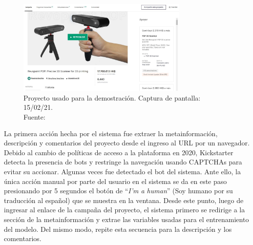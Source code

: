 \begin{figure}[!ht]
	\begin{center}
		\includegraphics[width=0.75\textwidth]{5/figures/example_project_150221.jpg}
		\caption[Proyecto usado para la demostración. Captura de pantalla: 15/02/21]{Proyecto usado para la demostración. Captura de pantalla: 15/02/21.\\
			Fuente: \cite{ot_kickstarter_revopointproject}}
		\label{4:fig30}
	\end{center}
\end{figure}

La primera acción hecha por el sistema fue extraer la metainformación, descripción y comentarios del proyecto desde el ingreso al URL por un navegador. Debido al cambio de políticas de acceso a la plataforma en 2020, Kickstarter detecta la presencia de bots y restringe la navegación usando CAPTCHAs para evitar su accionar. Algunas veces fue detectado el bot del sistema. Ante ello, la única acción manual por parte del usuario en el sistema se da en este paso presionando por 5 segundos el botón de “\textit{I'm a human}” (Soy humano por su traducción al español) que se muestra en la ventana. Desde este punto, luego de ingresar al enlace de la campaña del proyecto, el sistema primero se redirige a la sección de la metainformación y extrae las variables usadas para el entrenamiento del modelo. Del mismo modo, repite esta secuencia para la descripción y los comentarios.

